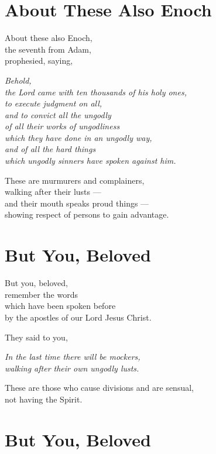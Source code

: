 \newpage\section{About These Also Enoch}

About these also Enoch,
\\
\tab{}
the seventh from Adam,
\\
prophesied,
saying,

{\itshape{}
  \tab{}
  Behold,
  \\
  \tab{}
  the Lord came with ten thousands of his holy ones,
  \\
  \tab{}
  to execute judgment on all,
  \\
  \tab{}
  and to convict all the ungodly
  \\
  \tab{}
  \tab{}
  of all their works of ungodliness
  \\
  \tab{}
  \tab{}
  \tab{}
  which they have done in an ungodly way,
  \\
  \tab{}
  and of all the hard things
  \\
  \tab{}
  \tab{}
  which ungodly sinners have spoken against him.
}

These are murmurers and complainers,
\\
walking after their lusts ---
\\
\tab{}
and their mouth speaks proud things ---
\\
\tab{}
\tab{}
showing respect of persons to gain advantage.

\newpage\section{But You, Beloved}

But you, beloved,
\\
remember the words
\\
\tab{}
which have been spoken before
\\
\tab{}
\tab{}
by the apostles of our Lord Jesus Christ.

They said to you,

{\itshape{}
  \tab{}
  In the last time there will be mockers,
  \\
  \tab{}
  walking after their own ungodly lusts.
}

These are those who cause divisions and are sensual,
\\
not having the Spirit.

\newpage\section{But You, Beloved}

